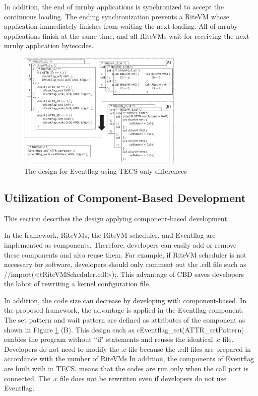 \documentclass{sig-alternate-05-2015}
\begin{document}
In addition, the end of mruby applications is synchronized to accept the continuous loading.
The ending synchronization prevents a RiteVM whose application immediately finishes from waiting the next loading.
All of mruby applications finish at the same time, and all RiteVMs wait for receiving the next mruby application bytecodes. 

\begin{figure}[t]
    \centering
    \includegraphics[width=8cm,clip]{figure/Eventflag.eps}
    \caption{The design for Eventflag using TECS {\scriptsize *only differences}}
    \label{fig:Eventflag}
\end{figure}
 
\subsection{Utilization of Component-Based Development}
This section describes the design applying component-based development.

In the framework, RiteVMs, the RiteVM scheduler, and Eventflag are implemented as components.
Therefore, developers can easily add or remove these components and also reuse them.
For example, if RiteVM scheduler is not necessary for software, developers should only comment out the .cdl file such as {\myit //import(<tRiteVMScheduler.cdl>);}.
This advantage of CBD saves developers the labor of rewriting a kernel configuration file.

In addition, the code size can decrease by developing with component-based. 
In the proposed framework, the advantage is applied in the Eventflag component.
The set pattern and wait pattern are defined as attributes of the component as shown in Figure \ref{fig:Eventflag} (B).
This design such as {\myit cEventflag\_set(ATTR\_setPattern)} enables the program without ``if" statements and reuses the identical .c file.
Developers do not need to modify the .c file because the .cdl files are prepared in accordance with the number of RiteVMs
In addition, the components of Eventflag are built with {\myit [optional]} in TECS.
{\myit [optional]} means that the codes are run only when the call port is connected.
The .c file does not be rewritten even if developers do not use Eventflag. 
\end{document}
